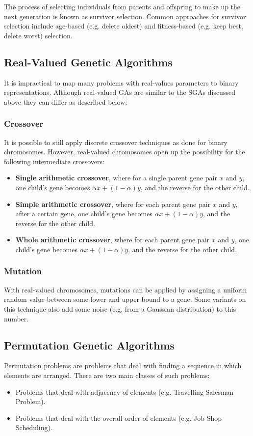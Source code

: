 \documentclass[12pt,titlepage]{article}
\begin{document}
        The process of selecting individuals from parents and offspring to make up the next generation is known as survivor selection. Common approaches for survivor selection
        include age-based (e.g. delete oldest) and fitness-based (e.g. keep best, delete worst) selection.

    \subsection{Real-Valued Genetic Algorithms}
      It is impractical to map many problems with real-values parameters to binary representations. Although real-valued GAs are similar to the SGAs discussed above they can
      differ as described below:

      \subsubsection{Crossover}
        It is possible to still apply discrete crossover techniques as done for binary chromosomes. However, real-valued chromosomes open up the possibility for the following
        intermediate crossovers:
        \begin{itemize}
          \item \textbf{Single arithmetic crossover}, where for a single parent gene pair $x$ and $y$, one child's gene becomes $\alpha x + (1 - \alpha) y$, and the reverse for the other child. 
          \item \textbf{Simple arithmetic crossover}, where for each parent gene pair $x$ and $y$, after a certain gene, one child's gene becomes $\alpha x + (1 - \alpha) y$, and the reverse
            for the other child. 
          \item \textbf{Whole arithmetic crossover}, where for each parent gene pair $x$ and $y$, one child's gene becomes $\alpha x + (1 - \alpha) y$, and the reverse for the other child.
        \end{itemize}

      \subsubsection{Mutation}
        With real-valued chromosomes, mutations can be applied by assigning a uniform random value between some lower and upper bound to a gene. Some variants on this technique also
        add some noise (e.g. from a Gaussian distribution) to this number.

    \subsection{Permutation Genetic Algorithms}
      Permutation problems are problems that deal with finding a sequence in which elements are arranged. There are two main classes of such problems:
      \begin{itemize}
        \item Problems that deal with adjacency of elements (e.g. Travelling Salesman Problem).
        \item Problems that deal with the overall order of elements (e.g. Job Shop Scheduling).
      \end{itemize}
\end{document}
